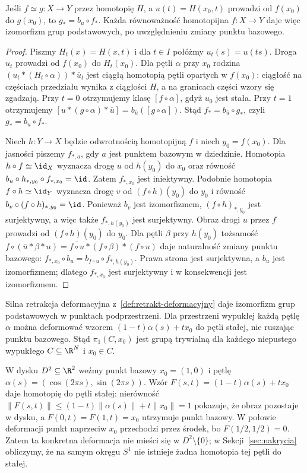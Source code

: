 \begin{wniosek}
\label{cor:pi1-homotopia}
Jeśli $f\simeq g:X\to Y$ przez homotopię
$H$, a $u(t)=H(x_0,t)$ prowadzi od
$f(x_0)$ do $g(x_0)$, to
$g_*=b_u\circ f_*$. Każda równoważność
homotopijna $f:X\to Y$ daje więc
izomorfizm grup podstawowych,
po uwzględnieniu zmiany punktu bazowego.
\end{wniosek}
\begin{proof}
Piszmy $H_t(x)=H(x,t)$ i dla $t\in I$ połóżmy
$u_t(s)=u(ts)$. Droga $u_t$ prowadzi od $f(x_0)$
do $H_t(x_0)$. Dla pętli $\alpha$ przy $x_0$
rodzina $(u_t*(H_t\circ\alpha))*\bar u_t$ jest
ciągłą homotopią pętli opartych w $f(x_0)$:
ciągłość na częściach przedziału wynika z ciągłości
$H$, a na granicach części wzory się zgadzają.
Przy $t=0$ otrzymujemy klasę $[f\circ\alpha]$,
gdyż $u_0$ jest stała. Przy $t=1$ otrzymujemy
$[u*(g\circ\alpha)*\bar u]
=b_{\bar u}([g\circ\alpha])$.
Stąd $f_*=b_{\bar u}\circ g_*$, czyli $g_*=b_u\circ f_*$.

Niech $h:Y\to X$ będzie odwrotnością homotopijną
$f$ i niech $y_0=f(x_0)$. Dla jasności piszemy
$f_{*,a}$, gdy $a$ jest punktem bazowym w dziedzinie.
Homotopia $h\circ f\simeq\id_X$ wyznacza drogę
$u$ od $h(y_0)$ do $x_0$ oraz równość
$b_u\circ h_{*,y_0}\circ f_{*,x_0}=\id$.
Zatem $f_{*,x_0}$ jest iniektywny.
Podobnie homotopia $f\circ h\simeq\id_Y$ wyznacza
drogę $v$ od $(f\circ h)(y_0)$ do $y_0$ i równość
$b_v\circ(f\circ h)_{*,y_0}=\id$. Ponieważ $b_v$ jest
izomorfizmem, $(f\circ h)_{*,y_0}$ jest surjektywny,
a więc także $f_{*,h(y_0)}$ jest surjektywny.
Obraz drogi $u$ przez $f$ prowadzi od $(f\circ h)(y_0)$
do $y_0$. Dla pętli $\beta$ przy $h(y_0)$
tożsamość $f\circ(\bar u*\beta*u)
=\overline{f\circ u}*(f\circ\beta)*(f\circ u)$
daje naturalność zmiany punktu bazowego:
$f_{*,x_0}\circ b_u=b_{f\circ u}\circ f_{*,h(y_0)}$.
Prawa strona jest surjektywna, a $b_u$ jest
izomorfizmem; dlatego $f_{*,x_0}$ jest
surjektywny i w konsekwencji jest izomorfizmem.
\end{proof}

Silna retrakcja deformacyjna
z~\ref{def:retrakt-deformacyjny} daje
izomorfizm grup podstawowych w punktach
podprzestrzeni. Dla przestrzeni wypukłej
każdą pętlę $\alpha$ można deformować
wzorem $(1-t)\alpha(s)+tx_0$ do pętli
stałej, nie ruszając punktu bazowego.
Stąd $\pi_1(C,x_0)$ jest grupą trywialną
dla każdego niepustego wypukłego $C\subseteq\R^N$
i $x_0\in C$.

\begin{przyklad}
\label{prz:petla-w-dysku}
W dysku $D^2\subseteq\R^2$ weźmy punkt bazowy
$x_0=(1,0)$ i pętlę
$\alpha(s)=(\cos(2\pi s),\sin(2\pi s))$.
Wzór $F(s,t)=(1-t)\alpha(s)+t x_0$ daje
homotopię do pętli stałej: nierówność
$\|F(s,t)\|\leq(1-t)\|\alpha(s)\|+t\|x_0\|=1$
pokazuje, że obraz pozostaje w dysku, a
$F(0,t)=F(1,t)=x_0$ utrzymuje punkt bazowy.
W połowie deformacji punkt naprzeciw $x_0$
przechodzi przez środek, bo $F(1/2,1/2)=0$.
Zatem ta konkretna deformacja nie mieści się
w $D^2\setminus\{0\}$; w Sekcji~\ref{sec:nakrycia}
obliczymy, że na samym okręgu $S^1$ nie istnieje
żadna homotopia tej pętli do stałej.
\end{przyklad}

